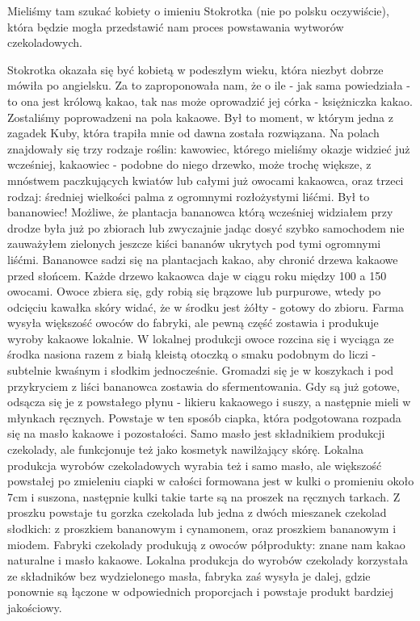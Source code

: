Mieliśmy tam szukać kobiety o imieniu Stokrotka (nie po polsku oczywiście), która będzie mogła przedstawić nam proces powstawania wytworów czekoladowych.
\par Stokrotka okazała się być kobietą w podeszłym wieku, która niezbyt dobrze mówiła po angielsku. 
Za to zaproponowała nam, że o ile - jak sama powiedziała - to ona jest królową kakao, tak nas może oprowadzić jej córka - księżniczka kakao.
Zostaliśmy poprowadzeni na pola kakaowe.
Był to moment, w którym jedna z zagadek Kuby, która trapiła mnie od dawna została rozwiązana.
Na polach znajdowały się trzy rodzaje roślin: kawowiec, którego mieliśmy okazje widzieć już wcześniej, kakaowiec - podobne do niego drzewko, może trochę większe, z mnóstwem paczkujących kwiatów lub całymi już owocami kakaowca, oraz trzeci rodzaj: średniej wielkości palma z ogromnymi rozłożystymi liśćmi.
Był to bananowiec!
Możliwe, że plantacja bananowca którą wcześniej widziałem przy drodze była już po zbiorach lub zwyczajnie jadąc dosyć szybko samochodem nie zauważyłem zielonych jeszcze kiści bananów ukrytych pod tymi ogromnymi liśćmi.
Bananowce sadzi się na plantacjach kakao, aby chronić drzewa kakaowe przed słońcem.
Każde drzewo kakaowca daje w ciągu roku między 100 a 150 owocami.
Owoce zbiera się, gdy robią się brązowe lub purpurowe, wtedy po odcięciu kawałka skóry widać, że w środku jest żółty - gotowy do zbioru.
Farma wysyła większość owoców do fabryki, ale pewną część zostawia i produkuje wyroby kakaowe lokalnie.
W lokalnej produkcji owoce rozcina się i wyciąga ze środka nasiona razem z białą kleistą otoczką o smaku podobnym do liczi - subtelnie kwaśnym i słodkim jednocześnie.
Gromadzi się je w koszykach i pod przykryciem z liści bananowca zostawia do sfermentowania.
Gdy są już gotowe, odsącza się je z powstałego płynu - likieru kakaowego i suszy, a następnie mieli w młynkach ręcznych.
Powstaje w ten sposób ciapka, która podgotowana rozpada się na masło kakaowe i pozostałości.
Samo masło jest składnikiem produkcji czekolady, ale funkcjonuje też jako kosmetyk nawilżający skórę.
Lokalna produkcja wyrobów czekoladowych wyrabia też i samo masło, ale większość powstałej po zmieleniu ciapki w całości formowana jest w kulki o promieniu około 7cm i suszona, następnie kulki takie tarte są na proszek na ręcznych tarkach.
Z proszku powstaje tu gorzka czekolada lub jedna z dwóch mieszanek czekolad słodkich: z proszkiem bananowym i cynamonem, oraz proszkiem bananowym i miodem.
Fabryki czekolady produkują z owoców półprodukty: znane nam kakao naturalne i masło kakaowe.
Lokalna produkcja do wyrobów czekolady korzystała ze składników bez wydzielonego masła, fabryka zaś wysyła je dalej, gdzie ponownie są łączone w odpowiednich proporcjach i powstaje produkt bardziej jakościowy.
